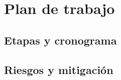 \chapter{Plan de trabajo}
\label{cap:plan}

\section{Etapas y cronograma}
\label{sec:cronograma}

\section{Riesgos y mitigación}
\label{sec:riesgos}
